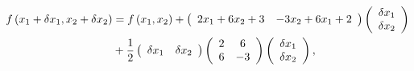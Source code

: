 \documentclass[aps,preprint]{revtex4}%
\begin{document}
\begin{align}
f\left(  x_{1}+\delta x_{1},x_{2}+\delta x_{2}\right)   &  =f\left(
x_{1},x_{2}\right)  +\left(
\begin{array}
[c]{cc}%
2x_{1}+6x_{2}+3 & -3x_{2}+6x_{1}+2
\end{array}
\right)  \left(
\begin{array}
[c]{c}%
\delta x_{1}\\
\delta x_{2}%
\end{array}
\right)  \\
&  +\frac{1}{2}\left(
\begin{array}
[c]{cc}%
\delta x_{1} & \delta x_{2}%
\end{array}
\right)  \left(
\begin{array}
[c]{cc}%
2 & 6\\
6 & -3
\end{array}
\right)  \left(
\begin{array}
[c]{c}%
\delta x_{1}\\
\delta x_{2}%
\end{array}
\right)  ,
\end{align}
\end{document}
